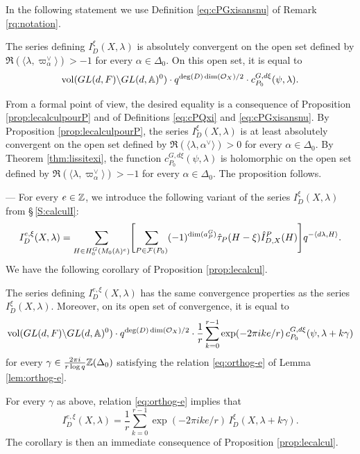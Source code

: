 \begin{paragr}
In the following statement we use Definition \eqref{eq:cPGxisansnu} of Remark \ref{rq:notation}.

\begin{proposition}\label{prop:lecalcul}
The series defining $I^{\xi}_D(X,\lambda)$ is absolutely convergent on the open set defined by $\Re(\langle \lambda, \varpi_\alpha^\vee\rangle)>-1$ for every $\alpha\in \Delta_0$. On this open set, it is equal to
$$\operatorname{vol}(GL(d,F)\backslash GL(d,\mathbb{A})^0) \cdot q^{\deg(D) \dim(\mathcal{O}_X)/2} \cdot c_{P_0}^{G,d\xi}(\psi,\lambda).$$
\end{proposition}

\begin{preuve}
From a formal point of view, the desired equality is a consequence of Proposition \ref{prop:lecalculpourP} and of Definitions \eqref{eq:cPQxi} and \eqref{eq:cPGxisansnu}. By Proposition \ref{prop:lecalculpourP}, the series $I^{\xi}_D(X,\lambda)$ is at least absolutely convergent on the open set defined by $\Re(\langle \lambda, \alpha^\vee\rangle)>0$ for every $\alpha\in \Delta_0$. By Theorem \ref{thm:lissitexi}, the function $c_{P_0}^{G,d\xi}(\psi,\lambda)$ is holomorphic on the open set defined by $\Re(\langle \lambda, \varpi_\alpha^\vee\rangle)>-1$ for every $\alpha\in \Delta_0$. The proposition follows.
\end{preuve}

\begin{paragr} --- For every $e\in \mathbb{Z}$, we introduce the following variant of the series $I^{\xi}_D(X,\lambda)$ from \S\,\ref{S:calculI}:
$$I^{e,\xi}_D(X,\lambda)= \sum_{H\in H_{0}^G(M_0(\mathbb{A})^e)} \Biggl[\sum_{P\in \mathcal{F}(P_0) } (-1)^{\dim(a_P^G)}\hat{\tau}_P(H-\xi) \hat{I}^P_{D,X}(H) \Biggr]   q^{-\langle d\lambda, H\rangle}.$$
We have the following corollary of Proposition \ref{prop:lecalcul}.

\begin{corollaire}\label{cor:serieIe}
The series defining $I^{e,\xi}_D(X,\lambda)$ has the same convergence properties as the series $I^{\xi}_D(X,\lambda)$. Moreover, on its open set of convergence, it is equal to
$$\operatorname{vol}(GL(d,F)\backslash GL(d,\mathbb{A})^0) \cdot q^{\deg(D) \dim(\mathcal{O}_X)/2} \cdot \frac1r \sum_{k=0}^{r-1} \exp(-2\pi i k e/r)\, c_{P_0}^{G,d\xi}(\psi,\lambda+k\gamma)$$
for every $\gamma\in \frac{2\pi i }{r \log q } \mathbb{Z}(\Delta_0)$ satisfying the relation \eqref{eq:orthog-e} of Lemma \ref{lem:orthog-e}.
\end{corollaire}

\begin{preuve}
For every $\gamma$ as above, relation \eqref{eq:orthog-e} implies that
$$I^{e,\xi}_D(X,\lambda)= \frac1r \sum_{k=0}^{r-1} \exp(-2\pi i k e/r)\, I^{\xi}_D(X,\lambda+k\gamma).$$
The corollary is then an immediate consequence of Proposition \ref{prop:lecalcul}.
\end{preuve}
\end{paragr}


\end{paragr}
